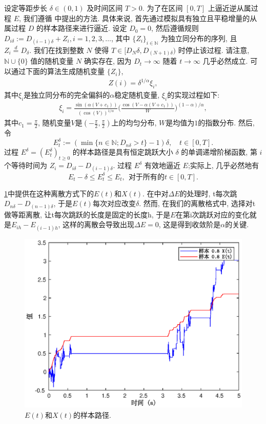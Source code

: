 \documentclass[12pt, final]{article}
\numberwithin{equation}{section}
\numberwithin{figure}{section}
\numberwithin{table}{section}
\theoremstyle{plain}
\theoremstyle{Definition}
\theoremstyle{Remark}
\begin{document}
	设定等距步长 $\delta \in (0, 1)$ 及时间区间 $T > 0$. 为了在区间 $[0, T]$ 上逼近逆从属过程 $E$, 我们遵循 \cite{magdziarz2009stochastic} 中提出的方法. 具体来说, 首先通过模拟具有独立且平稳增量的从属过程 $D$ 的样本路径来进行逼近. 设定 $D_0 = 0$, 然后遵循规则 $D_{i\delta} := D_{(i-1)\delta} + Z_i, i=1, 2, 3, \ldots$, 其中 $\{Z_i\}_{i \in \mathbb{N}}$ 为独立同分布的序列, 且 $Z_i \stackrel{d}{=} D_{\delta}$. 我们在找到整数 $N$ 使得 $T \in [D_N\delta, D_{(N+1)\delta})$ 时停止该过程. 请注意, $\mathbb{N}\cup\{0\}$ 值的随机变量 $N$ 确实存在, 因为 $D_t \to \infty$ 随着 $t \to \infty$ 几乎必然成立. 可以通过下面的算法生成随机变量 $\{Z_i\}$, 
	\begin{align*}
		Z(i)=\delta^{1/\alpha}\xi_{i}, 
	\end{align*}
	其中$\xi_i$是独立同分布的完全偏斜的$\alpha$稳定随机变量, $\xi_i$的实现过程如下:
	\begin{align*}
		\xi_i=\frac{\sin(\alpha(V+c_1))}{\left(\cos(V)\right)^{1/\alpha}}\Big(\frac{\cos(V-\alpha(V+c_1))}{W}\Big)^{(1-\alpha)/\alpha}, 
	\end{align*}
	其中$c_1 = \frac{\pi}{2}$, 随机变量$V$是$(-\frac{\pi}{2}, \frac{\pi}{2})$上的均匀分布, $W$是均值为$1$的指数分布. 
	然后, 令
	$$
	E_t^\delta := \left(\min\{n \in \mathbb{N}; D_{n\delta} > t\} - 1\right)\delta, \quad t \in [0, T]. 
	$$
	过程 $E^\delta = (E_t^\delta)_{t \geq 0}$ 的样本路径是具有恒定跳跃大小 $\delta$ 的单调递增阶梯函数, 第 $i$ 个等待时间为 $Z_i = D_{i\delta} - D_{(i-1)\delta}$. 过程 $E^\delta$ 有效地逼近 $E$;实际上, 几乎必然地有
	$$
	E_t - \delta \leq E_t^\delta \leq E_t , ~~\text{对于所有} 的 t \in [0, T]. 
	$$
	
	\cref{fig1}中提供在这种离散方式下的$E(t)$和$X(t)$. 在\cite{jin2019strong}中对$\Delta E$的处理时, t每次跳$D_{n\delta} - D_{(n-1)\delta}$, 于是$E(t)$每次对应改变$\delta$. 然而, 在我们的离散格式中, 选择对t做等距离散, 让t每次跳跃的长度是固定的长度h, 于是$E$在第i次跳跃对应的变化就是$E_{ih} - E_{(i-1)h}$, 这样的离散会导致出现$\Delta E=0$, 这是得到收敛阶是$\alpha$的关键. 
	\begin{figure}[htp!]
		\centering
		\includegraphics[width=0.6\linewidth]{EandX.eps}
		\caption{$E(t)$和$X(t)$的样本路径. }
		\label{fig1}
		\vspace{-2ex}
		{}
	\end{figure}
	
\end{document}
